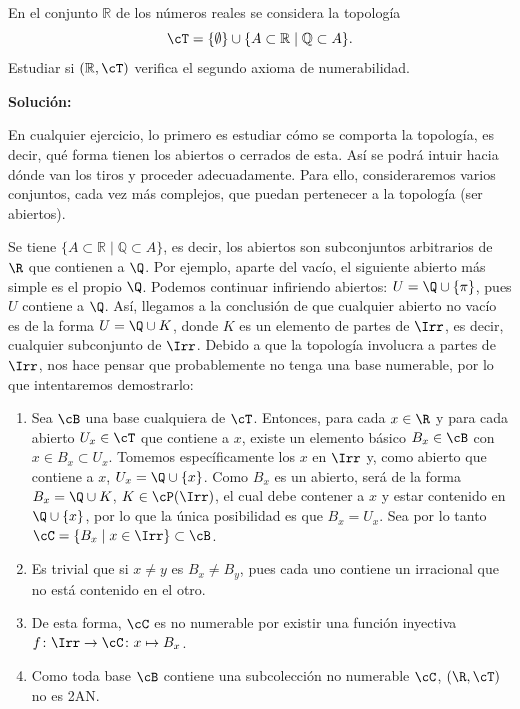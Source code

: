 {}


\begin{ex}
    En el conjunto \(\mathbb{R}\) de los números reales se considera la topología
    \[
        \cT = \{\emptyset\} \cup \{A \subset \mathbb{R} \mid \mathbb{Q} \subset A\}.
    \]
    Estudiar si \((\mathbb{R}, \cT)\) verifica el segundo axioma de numerabilidad.
    \bigskip

    \textbf{Solución:}
    
    En cualquier ejercicio, lo primero es estudiar cómo se comporta la topología, es decir, qué forma tienen los abiertos o cerrados de esta. Así se podrá intuir hacia dónde van los tiros y proceder adecuadamente. Para ello, consideraremos varios conjuntos, cada vez más complejos, que puedan pertenecer a la topología (ser abiertos).

    Se tiene $\{A \subset \mathbb{R} \mid \mathbb{Q} \subset A\}$, es decir, los abiertos son subconjuntos arbitrarios de $\R$ que contienen a $\Q$. Por ejemplo, aparte del vacío, el siguiente abierto más simple es el propio $\Q$. Podemos continuar infiriendo abiertos: $U = \Q \cup \{\pi\}$, pues $U$ contiene a $\Q$. Así, llegamos a la conclusión de que cualquier abierto no vacío es de la forma $U = \Q \cup K$, donde $K$ es un elemento de partes de $\Irr$, es decir, cualquier subconjunto de $\Irr$. Debido a que la topología involucra a partes de $\Irr$, nos hace pensar que probablemente no tenga una base numerable, por lo que intentaremos demostrarlo:

    \begin{enumerate}[topsep=5pt, itemsep=0pt]
        \item Sea $\cB$ una base cualquiera de $\cT$. Entonces, para cada $x \in \R$ y para cada abierto $U_x \in \cT$ que contiene a $x$, existe un elemento básico $B_x\in\cB$ con $x\in B_x \subset U_x$. Tomemos específicamente los $x$ en $\Irr$ y, como abierto que contiene a $x$, $U_x = \Q \cup \{x\}$. Como $B_x$ es un abierto, será de la forma $B_x = \Q \cup K$, $K\in\cP(\Irr)$, el cual debe contener a $x$ y estar contenido en $\Q \cup \{x\}$, por lo que la única posibilidad es que $B_x = U_x$. Sea por lo tanto $\cC = \{B_x \mid x\in \Irr\} \subset \cB$.
        \item Es trivial que si $x\neq y$ es $B_x \neq B_y$, pues cada uno contiene un irracional que no está contenido en el otro.
        \item De esta forma, $\cC$ es no numerable por existir una función inyectiva $f\colon \Irr\to\cC \colon x \mapsto B_x$.
        \item Como toda base $\cB$ contiene una subcolección no numerable $\cC$, $(\R,\cT)$ no es 2AN.
    \end{enumerate}
\end{ex}

